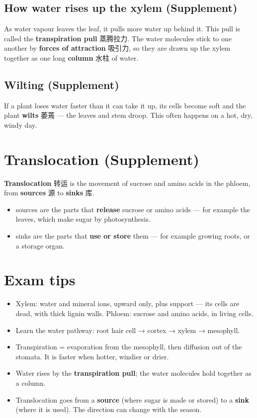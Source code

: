 \documentclass[11pt]{article}
\begin{document}
\subsection*{How water rises up the xylem (Supplement)}

As water vapour leaves the leaf, it pulls more water up behind it. This pull is called the \textbf{transpiration pull} 蒸腾拉力. The water molecules stick to one another by \textbf{forces of attraction} 吸引力, so they are drawn up the xylem together as one long \textbf{column} 水柱 of water.

\subsection*{Wilting (Supplement)}

If a plant loses water faster than it can take it up, its cells become soft and the plant \textbf{wilts} 萎蔫 — the leaves and stem droop. This often happens on a hot, dry, windy day.

\section*{Translocation (Supplement)}

\textbf{Translocation} 转运 is the movement of sucrose and amino acids in the phloem, from \textbf{sources} 源 to \textbf{sinks} 库.

\begin{itemize}
\item sources are the parts that \textbf{release} sucrose or amino acids — for example the leaves, which make sugar by photosynthesis.

\item sinks are the parts that \textbf{use or store} them — for example growing roots, or a storage organ.

\end{itemize}

\section*{Exam tips}

\begin{itemize}
\item Xylem: water and mineral ions, upward only, plus support — its cells are dead, with thick lignin walls. Phloem: sucrose and amino acids, in living cells.

\item Learn the water pathway: root hair cell → cortex → xylem → mesophyll.

\item Transpiration = evaporation from the mesophyll, then diffusion out of the stomata. It is faster when hotter, windier or drier.

\item Water rises by the \textbf{transpiration pull}; the water molecules hold together as a column.

\item Translocation goes from a \textbf{source} (where sugar is made or stored) to a \textbf{sink} (where it is used). The direction can change with the season.

\end{itemize}
\end{document}
